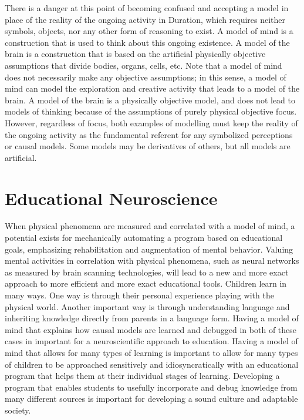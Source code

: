 There is a danger at this point of becoming confused and accepting a
model in place of the reality of the ongoing activity in Duration,
which requires neither symbols, objects, nor any other form of
reasoning to exist.  A model of mind is a construction that is used to
think about this ongoing existence.  A model of the brain is a
construction that is based on the artificial physically objective
assumptions that divide bodies, organs, cells, etc.  Note that a model
of mind does not necessarily make any objective assumptions; in this
sense, a model of mind can model the exploration and creative activity
that leads to a model of the brain.  A model of the brain is a
physically objective model, and does not lead to models of thinking
because of the assumptions of purely physical objective focus.
However, regardless of focus, both examples of modelling must keep the
reality of the ongoing activity as the fundamental referent for any
symbolized perceptions or causal models.  Some models may be
derivatives of others, but all models are artificial.

\section{Educational Neuroscience}

When physical phenomena are measured and correlated with a model of
mind, a potential exists for mechanically automating a program based
on educational goals, emphasizing rehabilitation and augmentation of
mental behavior.  Valuing mental activities in correlation with
physical phenomena, such as neural networks as measured by brain
scanning technologies, will lead to a new and more exact approach to
more efficient and more exact educational tools.  Children learn in
many ways.  One way is through their personal experience playing with
the physical world.  Another important way is through understanding
language and inheriting knowledge directly from parents in a language
form.  Having a model of mind that explains how causal models are
learned and debugged in both of these cases in important for a
neuroscientific approach to education.  Having a model of mind that
allows for many types of learning is important to allow for many types
of children to be approached sensitively and idiosyncratically with an
educational program that helps them at their individual stages of
learning.  Developing a program that enables students to usefully
incorporate and debug knowledge from many different sources is
important for developing a sound culture and adaptable society.

